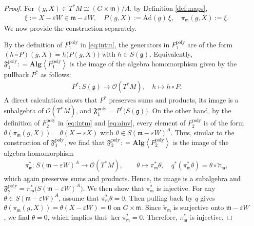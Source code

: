 \documentclass[11pt]{amsart}
\theoremstyle{definition}
\theoremstyle{plain}
\theoremstyle{conclusion}
\begin{document}
\begin{proof}
 For $(g,X)\in T^*M \cong  (G\times\mathfrak{m})/A$, by Definition \ref{def:maps}, \begin{align*}
  \xi:=X-\varepsilon W\in \mathfrak{m}-\varepsilon W,  \quad P(g,X):=\mathrm{Ad}(g)\,\xi, \quad \pi_{\mathfrak{m}}(g,X):=\xi.
\end{align*} We now provide the construction separately.  %
 
By the definition of $F_1^{\mathrm{poly}}$ in \eqref{eq:intm}, the generators in $F_1^{\mathrm{poly}}$ are of the form $(h\circ P)(g,X)=h\bigl(P(g,X)\bigr)$ with $h \in S(\mathfrak{g})$. Equivalently, $\mathfrak{F}_1^{\mathrm{poly}}: = \textbf{Alg} \left\langle F_1^{\mathrm{poly}}\right\rangle$ is the image of the algebra homomorphism given by the pullback $P^*$ as follows: \begin{align*}
  P^*:S(\mathfrak{g})\longrightarrow \mathcal{O}(T^*M),\quad h\longmapsto h\circ P.  
\end{align*} A direct calculation shows that $P^*$ preserves sums and products, its image is a subalgebra of $\mathcal{O}(T^*M)$, and $ \mathfrak{F}_1^{\mathrm{poly}} =P^*\bigl(S(\mathfrak{g})\bigr)$.  On the other hand, by the definition of $F_2^{\mathrm{poly}}$ in \eqref{eq:intm} and \eqref{eq:ainv}, every element of $F_2^{\mathrm{poly}}$ is of the form $ \theta ( \pi_\mathfrak{m}(g,X)) = \theta(X - \varepsilon X) $ with $ \theta\in S(\mathfrak{m}-\varepsilon W)^A$.  Thus, similar to the construction of $\mathfrak{F}_1^{\mathrm{poly}}$, we find that $\mathfrak{F}_2^{\mathrm{poly}}: = \textbf{Alg} \left\langle F_2^{\mathrm{poly}}\right\rangle$ is the image of the algebra homomorphism \begin{align*}
\pi_{\mathfrak{m}}^*:S(\mathfrak{m}-\varepsilon W)^A\longrightarrow \mathcal{O}(T^*M),\qquad \theta\longmapsto \pi_{\mathfrak{m}}^*\theta,\quad q^*(\pi_{\mathfrak{m}}^*\theta)=\theta\circ\widetilde{\pi}_{\mathfrak{m}},
\end{align*} which again preserves sums and products. Hence, its image is a subalgebra and $  \mathfrak{F}_2^{\mathrm{poly}} =\pi_{\mathfrak{m}}^*\bigl(S(\mathfrak{m}-\varepsilon W)^A\bigr)$. We then show that $\pi_\mathfrak{m}^*$ is injective. For any $\theta \in S(\mathfrak{m}-\varepsilon W)^A$, assume that $ \pi_\mathfrak{m}^*\theta = 0$. Then pulling back by $q$ gives $\theta(\pi_\mathfrak{m}(g,X)) = \theta(X - \varepsilon W) = 0$ on $G \times \mathfrak{m}$. Since $\widetilde{\pi}_\mathfrak{m}$ is surjective onto $\mathfrak{m} - \varepsilon W$, we find $\theta  = 0$, which implies that $\ker \pi_\mathfrak{m}^* = 0$. Therefore, $\pi_\mathfrak{m}^*$ is injective.
\end{proof}
\end{document}
